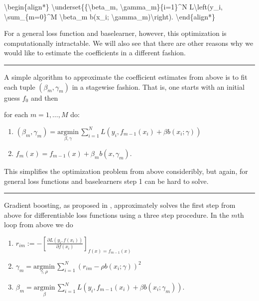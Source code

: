 \documentclass[letterpaper,10pt,english]{sphinxmanual}
\begin{document}
\textbackslash{}begin\{align*\}
\textbackslash{}underset\{\{\textbackslash{}beta\_m, \textbackslash{}gamma\_m\}\{i=1\}\textasciicircum{}N L\textbackslash{}left(y\_i, \textbackslash{}sum\_\{m=0\}\textasciicircum{}M \textbackslash{}beta\_m b(x\_i; \textbackslash{}gamma\_m)\textbackslash{}right).
\textbackslash{}end\{align*\}

For a general loss function and base\sphinxhyphen{}learner, however, this optimization is computationally intractable. We will also see that there are other reasons why we would like to estimate the coefficients in a different fashion.


\bigskip\hrule\bigskip



A simple algorithm to approximate the coefficient estimates from above is to fit each tuple \((\beta_m, \gamma_m)\) in a stage\sphinxhyphen{}wise fashion. That is, one starts with an initial guess \(f_0\) and then

for each \(m=1,\dots, M\) do:
\begin{enumerate}
%
\item {} 
\((\beta_m, \gamma_m) = \underset{\beta, \gamma}{\text{argmin}} \, \sum_{i=1}^N L \left(y_i, f_{m-1}(x_i) + \beta b(x_i; \gamma) \right)\)

\item {} 
\(f_m(x) = f_{m-1}(x) + \beta_m b(x, \gamma_m)\).

\end{enumerate}

This simplifies the optimization problem from above consideribly, but again, for general loss functions and base\sphinxhyphen{}learners step 1 can be hard to solve.


\bigskip\hrule\bigskip



Gradient boosting, as proposed in , approximately solves the first step from above for differentiable loss functions using a three step procedure. In the \(m\)\sphinxhyphen{}th loop from above we do
\begin{enumerate}
%
\item {} 
\(r_{im} := - \left[\frac{\partial L(y_i, f(x_i))}{\partial f(x_i)}  \right]_{f(x) = f_{m-1}(x)}\)

\item {} 
\(\gamma_m = \underset{\gamma, \rho}{\text{argmin}} \, \sum_{i=1}^N \left(r_{im} - \rho b(x_i; \gamma) \right)^2\)

\item {} 
\(\beta_m = \underset{\beta}{\text{argmin}} \, \sum_{i=1}^N L \left(y_i, f_{m-1}(x_i) + \beta b(x_i; \gamma_m) \right)\).

\end{enumerate}
\end{document}
